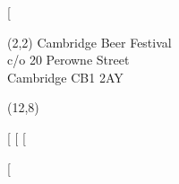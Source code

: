 \documentclass[english,a4paper]{article}
\begin{document}
[%

\begin{textblock}{7}(2,2)
\small{Cambridge Beer Festival}\\
\small{c/o 20 Perowne Street}\\
\small{Cambridge CB1 2AY}\\
\end{textblock}

\begin{textblock}{30}(12,8)
\large

[%
[%
[%

\end{textblock}
\null\newpage

[%
\end{document}
